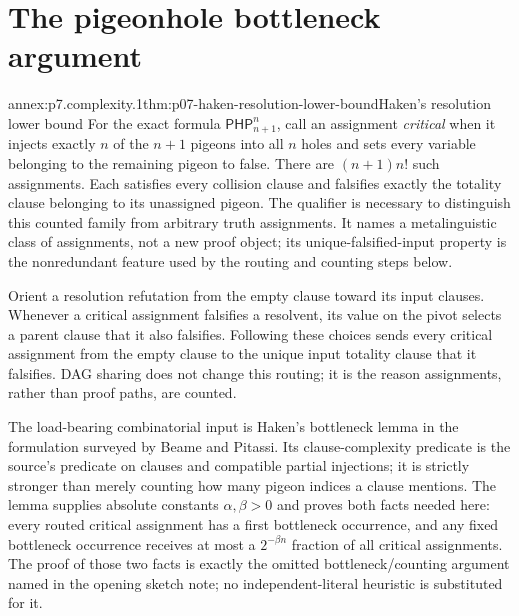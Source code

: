 
\section{The pigeonhole bottleneck argument}

\begin{annexitem}{annex:p7.complexity.1}{thm:p07-haken-resolution-lower-bound}{Haken's resolution lower bound}
For the exact formula \(\mathsf{PHP}^{n}_{n+1}\), call an assignment
\emph{critical} when it injects exactly \(n\) of the \(n+1\) pigeons into all
\(n\) holes and sets every variable belonging to the remaining pigeon to
false.  There are \((n+1)n!\) such assignments.  Each satisfies every
collision clause and falsifies exactly the totality clause belonging to its
unassigned pigeon.  The qualifier is necessary to distinguish this counted
family from arbitrary truth assignments.  It names a metalinguistic class of
assignments, not a new proof object; its unique-falsified-input property is the
nonredundant feature used by the routing and counting steps below.

Orient a resolution refutation from the empty clause toward its input clauses.
Whenever a critical assignment falsifies a resolvent, its value on the pivot
selects a parent clause that it also falsifies.  Following these choices sends
every critical assignment from the empty clause to the unique input totality
clause that it falsifies.  DAG sharing does not change this routing; it is the
reason assignments, rather than proof paths, are counted.

The load-bearing combinatorial input is Haken's bottleneck lemma in the
formulation surveyed by Beame and Pitassi.  Its clause-complexity predicate is
the source's predicate on clauses and compatible partial injections; it is
strictly stronger than merely counting how many pigeon indices a clause
mentions.  The lemma supplies absolute constants \(\alpha,\beta>0\) and proves
both facts needed here: every routed critical assignment has a first
bottleneck occurrence, and any fixed bottleneck occurrence receives at most a
\(2^{-\beta n}\) fraction of all critical assignments.  The proof of those two
facts is exactly the omitted bottleneck/counting argument named in the opening
sketch note; no independent-literal heuristic is substituted for it.


\end{annexitem}
